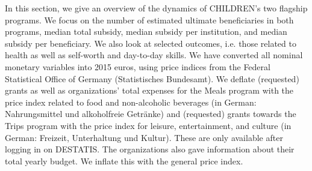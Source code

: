 \documentclass[12pt, a4paper, titlepage]{article}\usepackage[]{graphicx}\usepackage[]{color}
\begin{document}
In this section, we give an overview of the dynamics of CHILDREN's two flagship programs. We focus on the number of estimated ultimate beneficiaries in both programs, median total subsidy, median subsidy per institution, and median subsidy per beneficiary. We also look at selected outcomes, i.e. those related to health as well as self-worth and day-to-day skills. We have converted all nominal monetary variables into 2015 euros, using price indices from the Federal Statistical Office of Germany (Statistisches Bundesamt). We deflate (requested) grants as well as organizations' total expenses for the Meals program  with the price index related to food and non-alcoholic beverages (in German: Nahrungsmittel und alkoholfreie Getränke) and (requested) grants towards the Trips program with the price index for leisure, entertainment, and culture (in German: Freizeit, Unterhaltung und Kultur). These are only available after logging in on DESTATIS. The organizations also gave information about their total yearly budget. We inflate this with the general price index.




\begin{table}[!htbp] \centering 
  \caption{} 
  \label{fundamentalDynamics} 
\end{table} 
\end{document}
